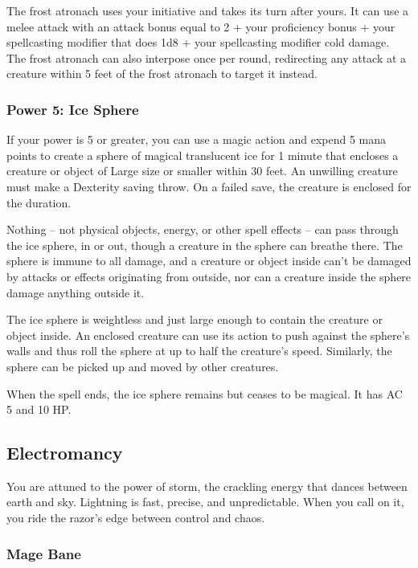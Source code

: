 \documentclass[12pt,letterpaper,twocolumn,openany,nodeprecatedcode,bg=none]{dndbook}
\begin{document}
The frost atronach uses your initiative and takes its turn after yours.
It can use a melee attack with an attack bonus equal to 2 + your
proficiency bonus + your spellcasting modifier that does 1d8 + your
spellcasting modifier cold damage. The frost atronach can also interpose
once per round, redirecting any attack at a creature within 5 feet of
the frost atronach to target it instead.

\subsubsection{Power 5: Ice Sphere}\label{power-5-ice-sphere}

If your power is 5 or greater, you can use a magic action and expend 5
mana points to create a sphere of magical translucent ice for 1 minute
that encloses a creature or object of Large size or smaller within 30
feet. An unwilling creature must make a Dexterity saving throw. On a
failed save, the creature is enclosed for the duration.

Nothing -- not physical objects, energy, or other spell effects -- can
pass through the ice sphere, in or out, though a creature in the sphere
can breathe there. The sphere is immune to all damage, and a creature or
object inside can't be damaged by attacks or effects originating from
outside, nor can a creature inside the sphere damage anything outside
it.

The ice sphere is weightless and just large enough to contain the
creature or object inside. An enclosed creature can use its action to
push against the sphere's walls and thus roll the sphere at up to half
the creature's speed. Similarly, the sphere can be picked up and moved
by other creatures.

When the spell ends, the ice sphere remains but ceases to be magical. It
has AC 5 and 10 HP.

\subsection{Electromancy}\label{electromancy}

You are attuned to the power of storm, the crackling energy that dances
between earth and sky. Lightning is fast, precise, and unpredictable.
When you call on it, you ride the razor's edge between control and
chaos.

\subsubsection{Mage Bane}\label{mage-bane}
\end{document}
